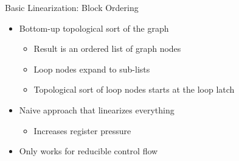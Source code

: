 
\begin{frame}{Basic Linearization: Block Ordering}

\begin{minipage}[t]{0.50\linewidth}

\begin{itemize}
    \item Bottom-up topological sort of the graph
    \begin{itemize}
        \item Result is an ordered list of graph nodes
        \item Loop nodes expand to sub-lists
        \item Topological sort of loop nodes starts at the loop latch
    \end{itemize}
    \item Naive approach that linearizes everything
    \begin{itemize}
        \item Increases register pressure
    \end{itemize}
    \item Only works for reducible control flow
\end{itemize}

\end{minipage}
\hspace{1em}
\begin{minipage}[t]{0.38\linewidth}

\vspace{0.1ex}



\end{minipage}
\end{frame}
